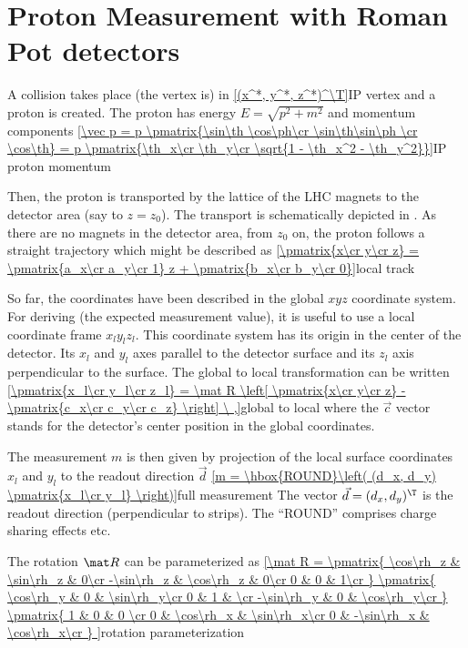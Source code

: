 \section[rp measurement]{Proton Measurement with Roman Pot detectors}

A collision takes place (the vertex is) in
\eqref{(x^*, y^*, z^*)^\T}{IP vertex}
and a proton is created. The proton has energy $E=\sqrt{p^2 + m^2}$ and momentum components
\eqref{\vec p = p \pmatrix{\sin\th \cos\ph\cr \sin\th\sin\ph \cr \cos\th} = 
p \pmatrix{\th_x\cr \th_y\cr \sqrt{1 - \th_x^2 - \th_y^2}}}{IP proton momentum}


Then, the proton is transported by the lattice of the LHC magnets to the detector area (say to $z = z_0$). The transport is schematically depicted in . As there are no magnets in the detector area, from $z_0$ on, the proton follows a straight trajectory which might be described as
\eqref{\pmatrix{x\cr y\cr z} = \pmatrix{a_x\cr a_y\cr 1} z + \pmatrix{b_x\cr b_y\cr 0}}{local track}

So far, the coordinates have been described in the global $xyz$ coordinate system. For deriving (the expected measurement value), it is useful to use a local coordinate frame $x_l y_l z_l$. This coordinate system has its origin in the center of the detector. Its $x_l$ and $y_l$ axes parallel to the detector surface and its $z_l$ axis perpendicular to the surface. The global to local transformation can be written
\eqref{\pmatrix{x_l\cr y_l\cr z_l} = \mat R \left[ \pmatrix{x\cr y\cr z}  - \pmatrix{c_x\cr c_y\cr c_z}  \right] \ ,}{global to local}
where the $\vec c$ vector stands for the detector's center position in the global coordinates.

The measurement $m$ is then given by projection of the local surface coordinates $x_l$ and $y_l$ to the readout direction $\vec d$
\eqref{m = \hbox{ROUND}\left( (d_x, d_y) \pmatrix{x_l\cr y_l} \right)}{full measurement}
The vector $\vec d = (d_x, d_y)^\T$ is the readout direction (perpendicular to strips). The ``ROUND'' comprises charge sharing effects etc.

The rotation $\mat R$ can be parameterized as
\eqref{\mat R =
\pmatrix{
\cos\rh_z  & \sin\rh_z & 0\cr
-\sin\rh_z & \cos\rh_z & 0\cr
0		   & 0         & 1\cr
}
\pmatrix{
\cos\rh_y  & 0 & \sin\rh_y\cr
0		   & 1 &          \cr
-\sin\rh_y & 0 & \cos\rh_y\cr
}
\pmatrix{
1 & 0		   & 0        \cr
0 & \cos\rh_x  & \sin\rh_x\cr
0 & -\sin\rh_x & \cos\rh_x\cr
}
}{rotation parameterization}

